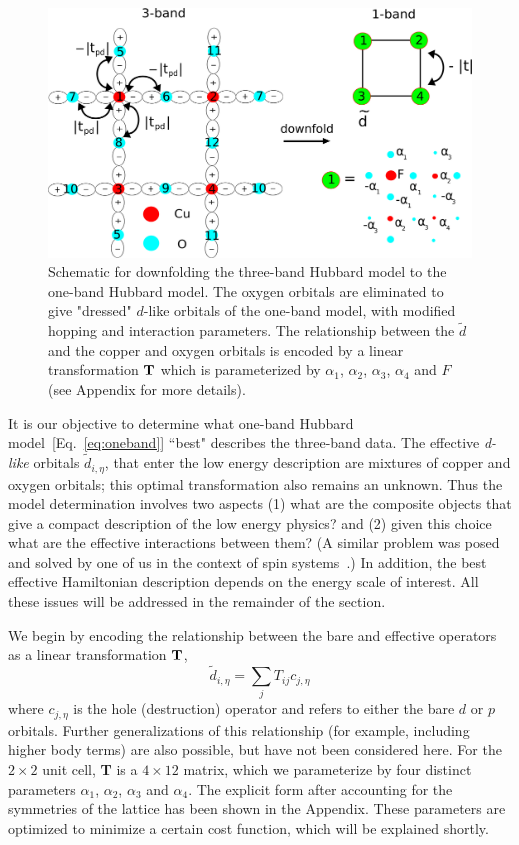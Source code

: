 \begin{figure}
\centering
\includegraphics[width=0.9\linewidth]{./Figures/three_band_figure.eps}
\caption{Schematic for downfolding the three-band Hubbard model to the one-band Hubbard model. The oxygen orbitals are 
eliminated to give "dressed" $d$-like orbitals of the one-band model, with modified hopping and interaction parameters. 
The relationship between the $\tilde{d}$ and the copper and oxygen orbitals is encoded by a linear transformation 
${\bf T}$ which is parameterized by $\alpha_1$, $\alpha_2$, $\alpha_3$, $\alpha_4$ and $F$ (see Appendix for more details).}
\label{fig:threeband} 
\end{figure}

It is our objective to determine what one-band Hubbard model~[Eq.~\eqref{eq:oneband}]
``best" describes the three-band data. The effective \textit{d-like} orbitals $\tilde{d}_{i,\eta}$, 
that enter the low energy description are mixtures of copper and oxygen orbitals; this optimal transformation also remains an unknown. 
Thus the model determination involves two aspects (1) what are the composite objects that give a 
compact description of the low energy physics? and (2) given this choice what are the effective interactions between them? 
(A similar problem was posed and solved by one of us in the context of spin systems~\cite{Changlani_percolation}.)
In addition, the best effective Hamiltonian description depends on the energy scale of interest. 
All these issues will be addressed in the remainder of the section. 

We begin by encoding the relationship between the bare and effective operators as a linear transformation ${\bf T}$, 
\begin{equation}
	\tilde{d}_{i,\eta} = \sum_{j} T_{ij} c_{j,\eta}
\label{eq:dc}
\end{equation}
where $c_{j,\eta}$ is the hole (destruction) operator and refers to either the bare $d$ or $p$ orbitals. 
Further generalizations of this relationship (for example, including higher body terms) are also possible, but have not been considered here. 
For the $2\times2$ unit cell, {\bf T} is a $4 \times 12 $ matrix, which we parameterize by four distinct parameters $\alpha_1$, $\alpha_2$, $\alpha_3$ and $\alpha_4$. 
The explicit form  after accounting for the symmetries of the lattice has been shown in the Appendix. These parameters are optimized to minimize a certain cost function, 
which will be explained shortly. 

